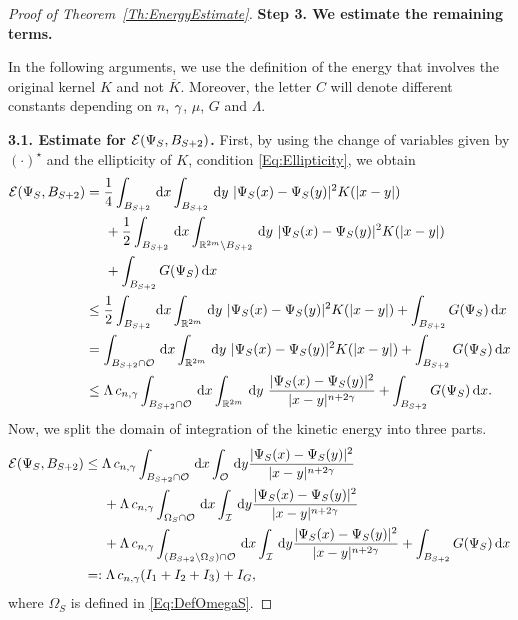 \begin{proof}[Proof of Theorem~\ref{Th:EnergyEstimate}]
\textbf{Step 3. We estimate the remaining terms.}

In the following arguments, we use the definition of the energy that involves the original kernel $K$ and not $\overline{K}$. Moreover, the letter $C$ will denote different constants depending on $n$, $\gamma$, $\mu$, $G$ and $\Lambda$.

\textbf{3.1. Estimate for $\mathcal{E}(\Psi_S,B_{S+2})$.}
First, by using the change of variables given by $(\cdot)^\star$ and the ellipticity of $K$, condition \eqref{Eq:Ellipticity}, we obtain
\begin{align*}
\ecal(\Psi_S,B_{S+2}) &= \frac{1}{4} \int_{B_{S+2}} \d x \int_{B_{S+2}} \d y\ |\Psi_S(x)-\Psi_S(y)|^2K(|x-y|)  \\
&\hspace{5mm} +\frac{1}{2} \int_{B_{S+2}} \d x \int_{\R^{2m} \setminus B_{S+2}} \d y \ |\Psi_S(x)-\Psi_S(y)|^2K(|x-y|) \\
&\hspace{5mm} + \int_{B_{S+2}} G(\Psi_S)  \d x\\
&\leq \frac{1}{2} \int_{B_{S+2}} \d x \int_{\R^{2m}} \d y\ |\Psi_S(x)-\Psi_S(y)|^2K(|x-y|) + \int_{B_{S+2}} G(\Psi_S) \d x \\
&= \int_{B_{S+2} \cap \ocal} \d x \int_{\R^{2m}} \d y\ |\Psi_S(x)-\Psi_S(y)|^2K(|x-y|)  + \int_{B_{S+2}} G(\Psi_S) \d x \\
&\leq \Lambda\, c_{n,\s} \int_{B_{S+2} \cap \ocal} \d x \int_{\R^{2m}} \d y \ \frac{|\Psi_S(x)-\Psi_S(y)|^2}{|x-y|^{n+2\s}} + \int_{B_{S+2}} G(\Psi_S) \d x.
\end{align*}
Now, we split the domain of integration of the kinetic energy into three parts.
\begin{align*}
\mathcal{E}(\Psi_S,B_{S+2}) &\leq \Lambda\, c_{n,\gamma} \int_{B_{S+2} \cap \mathcal{O}} \,\mathrm{d} x \int_{\mathcal{O}} \,\mathrm{d} y \frac{|\Psi_S(x)-\Psi_S(y)|^2}{|x-y|^{n+2\gamma}} \\
&\hspace{5mm} + \Lambda\, c_{n,\gamma} \int_{\Omega_S \cap \mathcal{O}} \,\mathrm{d} x \int_{\mathcal{I}} \,\mathrm{d} y \frac{|\Psi_S(x)-\Psi_S(y)|^2}{|x-y|^{n+2\gamma}} \\
&\hspace{5mm} + \Lambda\, c_{n,\gamma} \int_{(B_{S+2}\setminus \Omega_S) \cap \mathcal{O}} \,\mathrm{d} x \int_{\mathcal{I}} \,\mathrm{d} y \frac{|\Psi_S(x)-\Psi_S(y)|^2}{|x-y|^{n+2\gamma}} + \int_{B_{S+2}} G(\Psi_S) \,\mathrm{d} x\\
&=:\Lambda\, c_{n,\gamma} (I_1+I_2+I_3)+I_G,
\end{align*}
where $\Omega_S$ is defined in \eqref{Eq:DefOmegaS}. 


\end{proof}
